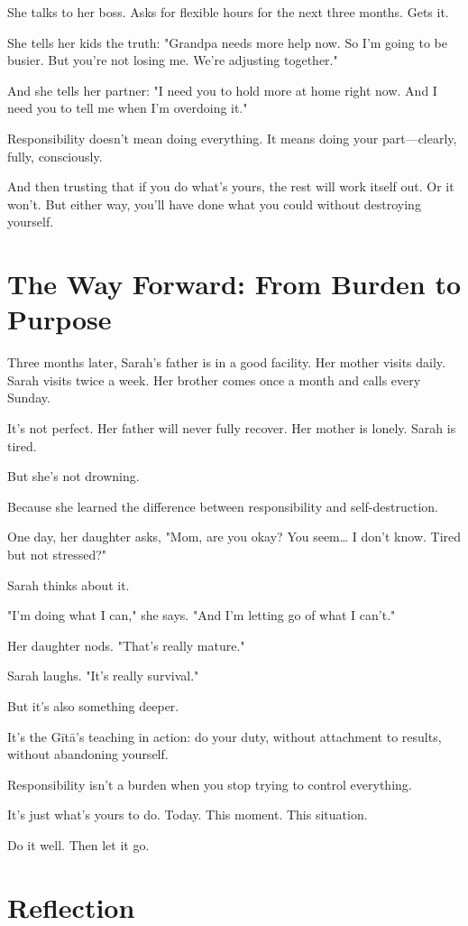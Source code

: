 \documentclass[11pt,twoside]{book}
\begin{document}
She talks to her boss. Asks for flexible hours for the next three months. Gets it.

She tells her kids the truth: "Grandpa needs more help now. So I'm going to be busier. But you're not losing me. We're adjusting together."

And she tells her partner: "I need you to hold more at home right now. And I need you to tell me when I'm overdoing it."

Responsibility doesn't mean doing everything. It means doing your part—clearly, fully, consciously.

And then trusting that if you do what's yours, the rest will work itself out. Or it won't. But either way, you'll have done what you could without destroying yourself.

\section*{The Way Forward: From Burden to Purpose}

Three months later, Sarah's father is in a good facility. Her mother visits daily. Sarah visits twice a week. Her brother comes once a month and calls every Sunday.

It's not perfect. Her father will never fully recover. Her mother is lonely. Sarah is tired.

But she's not drowning.

Because she learned the difference between responsibility and self-destruction.

One day, her daughter asks, "Mom, are you okay? You seem… I don't know. Tired but not stressed?"

Sarah thinks about it.

"I'm doing what I can," she says. "And I'm letting go of what I can't."

Her daughter nods. "That's really mature."

Sarah laughs. "It's really survival."

But it's also something deeper.

It's the Gītā's teaching in action: do your duty, without attachment to results, without abandoning yourself.

Responsibility isn't a burden when you stop trying to control everything.

It's just what's yours to do. Today. This moment. This situation.

Do it well. Then let it go.

\section*{Reflection}
\end{document}
